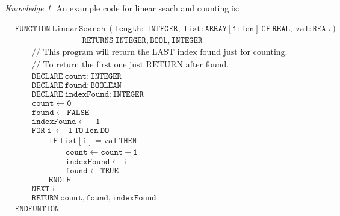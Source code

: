 \documentclass[8pt]{article}
\theoremstyle{remark}
\newtheorem{knowledge}{Knowledge}[subsection]
\begin{document}
            \begin{knowledge}
                An example code for linear seach and counting is:

                \begin{align*}
                    &\mathtt{FUNCTION\ LinearSearch\ (length:\ INTEGER,\ list:ARRAY [1:len]\ OF\ REAL,\ val:REAL)}\\
                    &\qquad \qquad \qquad \qquad \mathtt{RETURNS\ INTEGER, BOOL, INTEGER}\\
                    &\qquad \text{// This program will return the LAST index found just for counting.}\\
                    &\qquad \text{// To return the first one just RETURN after found.}\\
                    &\qquad \mathtt{DECLARE\ count:INTEGER}\\
                    &\qquad \mathtt{DECLARE\ found:BOOLEAN}\\
                    &\qquad \mathtt{DECLARE\ indexFound:INTEGER}\\
                    &\qquad \mathtt{count \leftarrow 0}\\
                    &\qquad \mathtt{found \leftarrow FALSE}\\
                    &\qquad \mathtt{indexFound \leftarrow -1}\\
                    &\qquad \mathtt{FOR\ i\ \leftarrow\ 1\ TO\ len\ DO}\\
                    &\qquad \qquad \mathtt{IF\ list[i]=val\ THEN}\\
                    &\qquad \qquad \qquad \mathtt{count \leftarrow count + 1}\\
                    &\qquad \qquad \qquad \mathtt{indexFound \leftarrow i}\\
                    &\qquad \qquad \qquad \mathtt{found \leftarrow TRUE}\\
                    &\qquad \qquad \mathtt{ENDIF}\\
                    &\qquad \mathtt{NEXT\ i}\\
                    &\qquad \mathtt{RETURN\ count, found, indexFound}\\
                    &\mathtt{ENDFUNTION}
                \end{align*}
            \end{knowledge}
\end{document}

